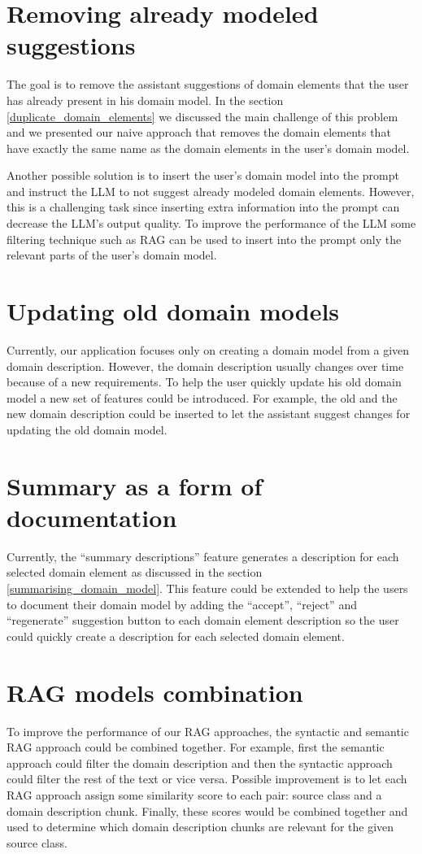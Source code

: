 \section{Removing already modeled suggestions}

The goal is to remove the assistant suggestions of domain elements that the user has already present in his domain model. In the section \ref{duplicate_domain_elements} we discussed the main challenge of this problem and we presented our naive approach that removes the domain elements that have exactly the same name as the domain elements in the user's domain model.

Another possible solution is to insert the user's domain model into the prompt and instruct the LLM to not suggest already modeled domain elements. However, this is a challenging task since inserting extra information into the prompt can decrease the LLM's output quality. To improve the performance of the LLM some filtering technique such as RAG can be used to insert into the prompt only the relevant parts of the user's domain model.


\section{Updating old domain models}

Currently, our application focuses only on creating a domain model from a given domain description. However, the domain description usually changes over time because of a new requirements. To help the user quickly update his old domain model a new set of features could be introduced. For example, the old and the new domain description could be inserted to let the assistant suggest changes for updating the old domain model.


\section{Summary as a form of documentation}

Currently, the ``summary descriptions'' feature generates a description for each selected domain element as discussed in the section \ref{summarising_domain_model}. This feature could be extended to help the users to document their domain model by adding the ``accept'', ``reject'' and ``regenerate'' suggestion button to each domain element description so the user could quickly create a description for each selected domain element.


\section{RAG models combination}

To improve the performance of our RAG approaches, the syntactic and semantic RAG approach could be combined together. For example, first the semantic approach could filter the domain description and then the syntactic approach could filter the rest of the text or vice versa. Possible improvement is to let each RAG approach assign some similarity score to each pair: source class and a domain description chunk. Finally, these scores would be combined together and used to determine which domain description chunks are relevant for the given source class.